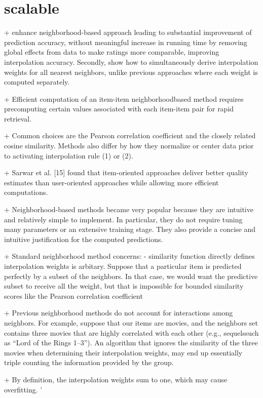 \section{scalable}
\cite{scalable}
\citeyear{scalable}

+ enhance neighborhood-based approach leading to substantial improvement of prediction accuracy, without meaningful increase in running time by removing global effects from data to make ratings more comparable, improving interpolation accuracy. Secondly, show how to simultaneously derive interpolation weights for all nearest neighbors, unlike previous approaches where each weight is computed separately. 

+ Efficient computation of an item-item neighborhoodbased
method requires precomputing certain values associated
with each item-item pair for rapid retrieval.

+ Common choices are the Pearson correlation coefficient and the closely related cosine similarity. Methods also differ by how they normalize or center data prior to activating interpolation rule (1) or (2).

+ Sarwar et al. [15] found that item-oriented approaches deliver better
quality estimates than user-oriented approaches while allowing
more efficient computations.

+ Neighborhood-based methods became very popular because
they are intuitive and relatively simple to implement.
In particular, they do not require tuning many parameters
or an extensive training stage. They also provide a concise
and intuitive justification for the computed predictions.

+ Standard neighborhood method concerns:
- similarity function directly defines interpolation weights is arbitary. Suppose that a particular item is predicted
perfectly by a subset of the neighbors. In that
case, we would want the predictive subset to receive
all the weight, but that is impossible for bounded similarity
scores like the Pearson correlation coefficient

+ Previous neighborhood methods do not account for interactions among neighbors. For example,
suppose that our items are movies, and the neighbors
set contains three movies that are highly correlated
with each other (e.g., sequelssuch as “Lord of the
Rings 1–3”). An algorithm that ignores the similarity
of the three movies when determining their interpolation
weights, may end up essentially triple counting the
information provided by the group.

+ By definition, the interpolation weights sum to one, which may cause overfitting. '


